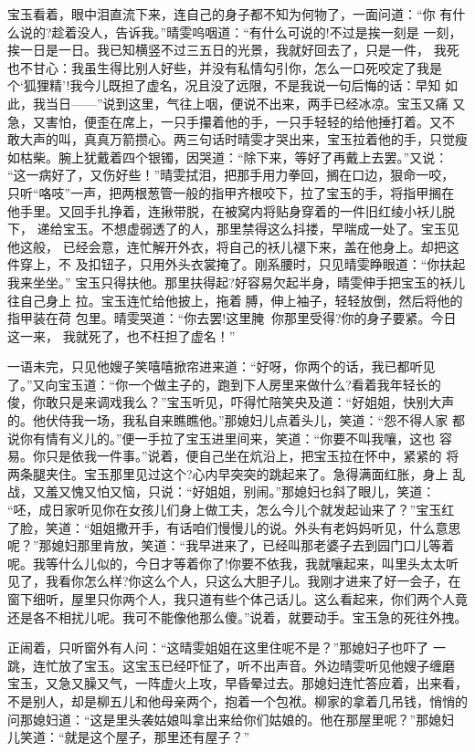 宝玉看着，眼中泪直流下来，连自己的身子都不知为何物了，一面问道：“你
有什么说的?趁着没人，告诉我。”晴雯呜咽道：“有什么可说的!不过是挨一刻是
一刻，挨一日是一日。我已知横竖不过三五日的光景，我就好回去了，只是一件，
我死也不甘心：我虽生得比别人好些，并没有私情勾引你，怎么一口死咬定了我是
个‘狐狸精’!我今儿既担了虚名，况且没了远限，不是我说一句后悔的话：早知
如此，我当日——”说到这里，气往上咽，便说不出来，两手已经冰凉。宝玉又痛
又急，又害怕，便歪在席上，一只手攥着他的手，一只手轻轻的给他捶打着。又不
敢大声的叫，真真万箭攒心。两三句话时晴雯才哭出来，宝玉拉着他的手，只觉瘦
如枯柴。腕上犹戴着四个银镯，因哭道：“除下来，等好了再戴上去罢。”又说：
“这一病好了，又伤好些！”晴雯拭泪，把那手用力拳回，搁在口边，狠命一咬，
只听“咯吱”一声，把两根葱管一般的指甲齐根咬下，拉了宝玉的手，将指甲搁在
他手里。又回手扎挣着，连揪带脱，在被窝内将贴身穿着的一件旧红绫小袄儿脱下，
递给宝玉。不想虚弱透了的人，那里禁得这么抖搂，早喘成一处了。宝玉见他这般，
已经会意，连忙解开外衣，将自己的袄儿褪下来，盖在他身上。却把这件穿上，不
及扣钮子，只用外头衣裳掩了。刚系腰时，只见晴雯睁眼道：“你扶起我来坐坐。”
宝玉只得扶他。那里扶得起?好容易欠起半身，晴雯伸手把宝玉的袄儿往自己身上
拉。宝玉连忙给他披上，拖着膊，伸上袖子，轻轻放倒，然后将他的指甲装在荷
包里。晴雯哭道：“你去罢!这里腌，你那里受得?你的身子要紧。今日这一来，
我就死了，也不枉担了虚名！”

一语未完，只见他嫂子笑嘻嘻掀帘进来道：“好呀，你两个的话，我已都听见
了。”又向宝玉道：“你一个做主子的，跑到下人房里来做什么?看着我年轻长的
俊，你敢只是来调戏我么？”宝玉听见，吓得忙陪笑央及道：“好姐姐，快别大声
的。他伏侍我一场，我私自来瞧瞧他。”那媳妇儿点着头儿，笑道：“怨不得人家
都说你有情有义儿的。”便一手拉了宝玉进里间来，笑道：“你要不叫我嚷，这也
容易。你只是依我一件事。”说着，便自己坐在炕沿上，把宝玉拉在怀中，紧紧的
将两条腿夹住。宝玉那里见过这个?心内早突突的跳起来了。急得满面红胀，身上
乱战，又羞又愧又怕又恼，只说：“好姐姐，别闹。”那媳妇乜斜了眼儿，笑道：
“呸，成日家听见你在女孩儿们身上做工夫，怎么今儿个就发起讪来了？”宝玉红
了脸，笑道：“姐姐撒开手，有话咱们慢慢儿的说。外头有老妈妈听见，什么意思
呢？”那媳妇那里肯放，笑道：“我早进来了，已经叫那老婆子去到园门口儿等着
呢。我等什么儿似的，今日才等着你了!你要不依我，我就嚷起来，叫里头太太听
见了，我看你怎么样?你这么个人，只这么大胆子儿。我刚才进来了好一会子，在
窗下细听，屋里只你两个人，我只道有些个体己话儿。这么看起来，你们两个人竟
还是各不相扰儿呢。我可不能像他那么傻。”说着，就要动手。宝玉急的死往外拽。

正闹着，只听窗外有人问：“这晴雯姐姐在这里住呢不是？”那媳妇子也吓了
一跳，连忙放了宝玉。这宝玉已经吓怔了，听不出声音。外边晴雯听见他嫂子缠磨
宝玉，又急又臊又气，一阵虚火上攻，早昏晕过去。那媳妇连忙答应着，出来看，
不是别人，却是柳五儿和他母亲两个，抱着一个包袱。柳家的拿着几吊钱，悄悄的
问那媳妇道：“这是里头袭姑娘叫拿出来给你们姑娘的。他在那屋里呢？”那媳妇
儿笑道：“就是这个屋子，那里还有屋子？”

